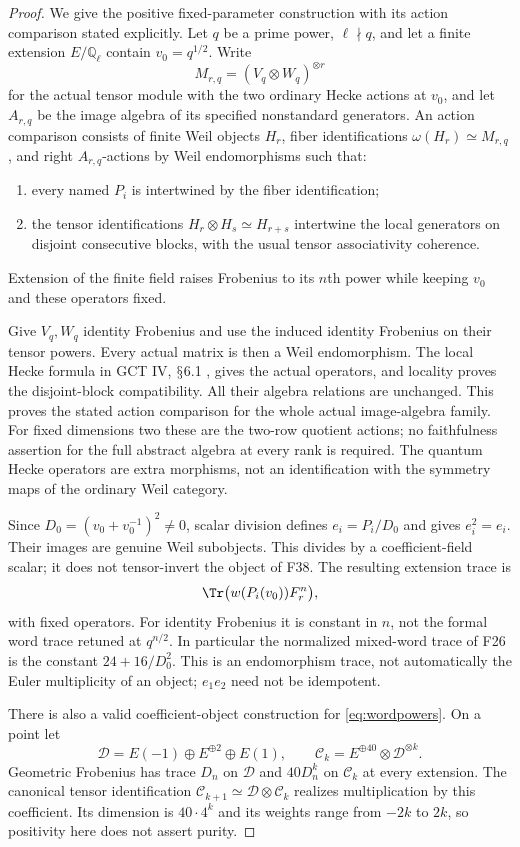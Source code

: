 \documentclass[11pt,a4paper]{article}
\newcommand{\Q}{\mathbb Q}\newcommand{\Z}{\mathbb Z}\newcommand{\C}{\mathbb C}\newcommand{\N}{\mathbb N}\newcommand{\F}{\mathbb F}
\renewcommand{\S}{\ensuremath{\mathsection}}
\newcommand{\fid}[1]{\textsf{#1}}\newcommand{\gate}[1]{\textsf{#1}}
\theoremstyle{named}\newtheorem{finding}{Finding}[section]
\theoremstyle{definition}\newtheorem{definition}[finding]{Definition}
\theoremstyle{remark}\newtheorem{remark}[finding]{Remark}
\begin{document}
\begin{proof}
We give the positive fixed-parameter construction with its
action comparison stated explicitly. Let $q$ be a prime power,
$\ell\nmid q$, and let a finite extension $E/\Q_\ell$
contain $v_0=q^{1/2}$.
Write
\[
 M_{r,q}=(V_q\otimes W_q)^{\otimes r}
\]
for the actual tensor module with the two ordinary Hecke
actions at $v_0$, and let $A_{r,q}$ be the image algebra of its
specified nonstandard generators. An action comparison consists
of finite Weil objects $H_r$, fiber identifications
$\omega(H_r)\simeq M_{r,q}$, and right $A_{r,q}$-actions
by Weil endomorphisms such that:
\begin{enumerate}
\item every named $P_i$ is intertwined by the fiber
identification;
\item the tensor identifications $H_r\otimes H_s\simeq H_{r+s}$
intertwine the local generators on disjoint consecutive blocks,
with the usual tensor associativity coherence.
\end{enumerate}
Extension of the finite field raises Frobenius to its $n$th
power while keeping $v_0$ and these operators fixed.

Give $V_q,W_q$ identity Frobenius and use the induced identity
Frobenius on their tensor powers. Every actual matrix is then
a Weil endomorphism. The local Hecke formula in
GCT IV, \S6.1 \cite[\S6.1, p.~33]{IV}, gives the actual operators, and locality proves
the disjoint-block compatibility. All their algebra relations
are unchanged. This proves the stated action comparison for
the whole actual image-algebra family.
For fixed dimensions two these are the two-row quotient actions;
no faithfulness assertion for the full abstract algebra at
every rank is required. The quantum Hecke operators are extra
morphisms, not an identification with the symmetry maps of the
ordinary Weil category.

Since $D_0=(v_0+v_0^{-1})^2\ne0$, scalar division defines
$e_i=P_i/D_0$ and gives $e_i^2=e_i$. Their images are genuine
Weil subobjects. This divides by a coefficient-field scalar;
it does not tensor-invert the object of \fid{F38}.
The resulting extension trace is
\[
 \Tr\bigl(w(P_i(v_0))F_r^n\bigr),
\]
with fixed operators. For identity Frobenius it is constant
in $n$, not the formal word trace retuned at $q^{n/2}$.
In particular the normalized mixed-word trace of \fid{F26}
is the constant $24+16/D_0^2$. This is an endomorphism trace,
not automatically the Euler multiplicity of an object;
$e_1e_2$ need not be idempotent.

There is also a valid coefficient-object construction for
\eqref{eq:wordpowers}. On a point let
\[
 \mathcal D=E(-1)\oplus E^{\oplus2}\oplus E(1),\qquad
 \mathcal C_k=E^{\oplus40}\otimes\mathcal D^{\otimes k}.
\]
Geometric Frobenius has trace $D_n$ on $\mathcal D$ and
$40D_n^k$ on $\mathcal C_k$ at every extension.
The canonical tensor identification
$\mathcal C_{k+1}\simeq\mathcal D\otimes\mathcal C_k$
realizes multiplication by this coefficient.
Its dimension is $40\cdot4^k$ and its weights range from
$-2k$ to $2k$, so positivity here does not assert purity.


\end{proof}
\end{document}
